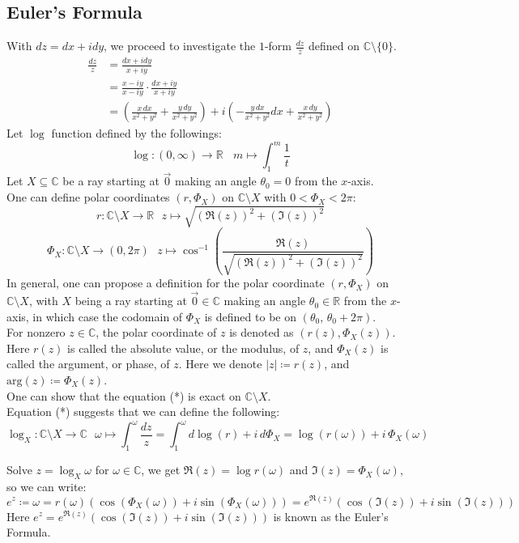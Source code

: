 \documentclass[15pt]{book}
\theoremstyle{break}
\theoremstyle{break}
\newcommand{\R}{\mathbb{R}}
\newcommand{\Complex}{\mathbb{C}}
\begin{document}
\subsection*{Euler's Formula}
With $dz = dx+idy$, we proceed to investigate the $1$-form $\frac{dz}{z}$ defined on $\Complex\setminus \{0\}$.
\begin{align*}
\frac{dz}{z} &= \frac{dx+i dy}{x+iy}\\
&= \frac{x-iy}{x-iy}\cdot \frac{dx + iy}{x+iy}\\
&= \left( \frac{x\, dx}{x^2+y^2} + \frac{y\, dy}{x^2+y^2}\right) +i\left(-\frac{y\, dx}{x^2+y^2} dx + \frac{x\, dy}{x^2+y^2}\right) \tag{*}
\end{align*}
Let $\log$ function defined by the followings:
$$\log: (0,\infty) \to \R \ \ \ \ m \mapsto \int_1^m \frac{1}{t}$$
Let $X\subseteq \Complex$ be a ray starting at $\vec{0}$ making an angle $\theta_0 = 0$ from the $x$-axis.\\ One can define polar coordinates $(r,\Phi_X)$ on $\Complex \setminus X$ with $0< \Phi_X < 2\pi$:
$$r:\Complex \setminus X\to \R \ \ \ z\mapsto \sqrt{(\Re(z))^2 + (\Im(z))^2}$$
$$\Phi_X: \Complex\setminus X \to (0,2\pi) \ \ \ z\mapsto \cos^{-1}\left(\frac{\Re{(z)}}{\sqrt{(\Re{(z)})^2+(\Im(z))^2}}\right)$$ 
In general, one can propose a definition for the polar coordinate $(r,\Phi_X)$ on $\Complex \setminus X$, with $X$ being a ray starting at $\vec{0}\in \Complex$ making an angle $\theta_0 \in \R$ from the $x$-axis, in which case the codomain of $\Phi_X$ is defined to be on $(\theta_0,\, \theta_0 + 2\pi)$. \\

For nonzero $z\in \Complex$, the polar coordinate of $z$ is denoted as $(r(z),\Phi_X(z))$. Here $r(z)$ is called the absolute value, or the modulus, of $z$, and $\Phi_X(z)$ is called the argument, or phase, of $z$. Here we denote $|z| \coloneqq r(z)$, and $\text{arg}(z) \coloneqq \Phi_X(z)$. \\


One can show that the equation (*) is exact on $\Complex \setminus X$.\\
Equation (*) suggests that we can define the following:
$$\log_X:\Complex\setminus X \to \Complex \ \ \ \omega \mapsto \int_1^\omega \frac{dz}{z} = \int_1^\omega d\log(r) + i\, d\Phi_X = \log (r(\omega)) + i\,\Phi_X(\omega)$$ 


Solve $z = \log_X \omega$ for $\omega \in \Complex$, we get $\Re(z) = \log r(\omega)$ and $\Im(z) = \Phi_X(\omega)$, so we can write:
$$e^z \coloneqq \omega = r(\omega)(\cos(\Phi_X(\omega)) + i\sin(\Phi_X(\omega))) = e^{\Re(z)} (\cos(\Im(z))+ i\sin(\Im(z)))$$
Here $e^z = e^{\Re(z)} (\cos(\Im(z))+ i\sin(\Im(z)))$ is known as the Euler's Formula.\\
\end{document}
